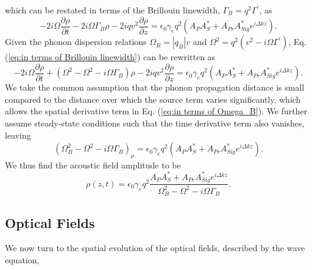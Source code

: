 \documentclass[sn-nature]{sn-jnl}%
\begin{document}
which can be restated in terms of the Brillouin linewidth, $\Gamma_{B} = q^{2}\Gamma^{\prime}$, as
\begin{equation}
    -2i\Omega\frac{\partial\rho}{\partial t} - 2i\Omega\Gamma_{B}\rho - 2iqv^{2}\frac{\partial\rho}{\partial z} = \epsilon_{0}\gamma_{e}q^{2}(A_{P}A_{S}^{*} + A_{Pr}A_{Sig}^{*}e^{i\Delta kz}).
    \label{eq:in terms of Brillouin linewidth}
\end{equation}
Given the phonon dispersion relations $\Omega_{B} = |q_{B}|v$ and $\Omega^{2} = q^{2}\left(v^{2} - i\Omega\Gamma^{\prime}\right)$, Eq. (\ref{eq:in terms of Brillouin linewidth}) can be rewritten as
\begin{equation}
    -2i\Omega\frac{\partial\rho}{\partial t} + \left(\Omega^{2} - \Omega^{2} - i\Omega\Gamma_{B}\right)\rho - 2iqv^{2}\frac{\partial\rho}{\partial z} = \epsilon_{0}\gamma_{e}q^{2}(A_{P}A_{S}^{*} + A_{Pr}A_{Sig}^{*}e^{i\Delta kz}).
    \label{eq:in terms of Omega_B}
\end{equation}
We take the common assumption that the phonon propagation distance is small compared to the distance over which the source term varies significantly, which allows the spatial derivative term in Eq. (\ref{eq:in terms of Omega_B}). We further assume steady-state conditions such that the time derivative term also vanishes, leaving
\begin{equation}
    (\Omega^{2}_{B} - \Omega^{2} - i\Omega\Gamma_{B})_{\rho} = \epsilon_{0}\gamma_{e}q^{2}(A_{P}A_{S}^{*} + A_{Pr}A_{Sig}^{*}e^{i\Delta kz}).
\end{equation}
We thus find the acoustic field amplitude to be
\begin{equation}
    \rho(z,t) = \epsilon_{0}\gamma_{e}q^{2}\frac{A_{P}A_{S}^{*} + A_{Pr}A_{Sig}^{*}e^{i\Delta kz}}{\Omega_{B}^{2} - \Omega^{2} - i\Omega\Gamma_{B}}.
    \label{eq:Acoustic field amplitude}
\end{equation}
\subsection{Optical Fields}
We now turn to the spatial evolution of the optical fields, described by the wave equation,
\end{document}
